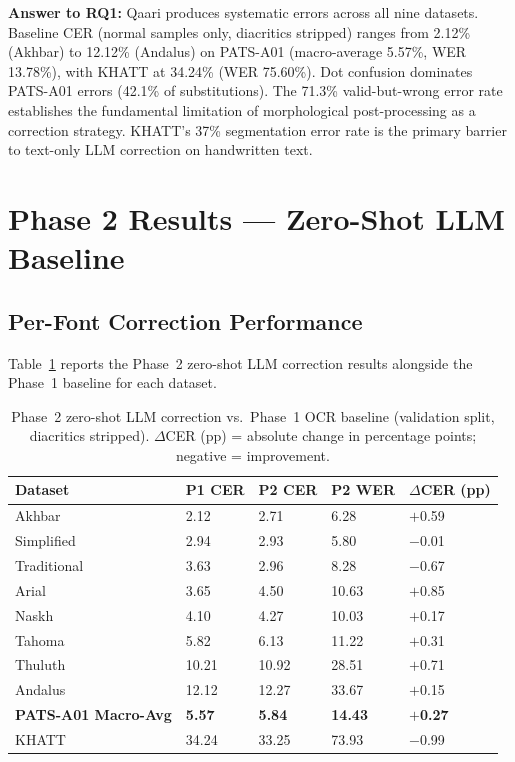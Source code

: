 \textbf{Answer to RQ1:} Qaari produces systematic errors across all nine
datasets. Baseline CER (normal samples only, diacritics stripped) ranges from
2.12\% (Akhbar) to 12.12\% (Andalus) on PATS-A01 (macro-average 5.57\%,
WER 13.78\%), with KHATT at 34.24\% (WER 75.60\%). Dot confusion dominates
PATS-A01 errors (42.1\% of substitutions). The 71.3\% valid-but-wrong
error rate establishes the fundamental limitation of morphological
post-processing as a correction strategy. KHATT's 37\% segmentation error
rate is the primary barrier to text-only LLM correction on handwritten text.

\section{Phase 2 Results --- Zero-Shot LLM Baseline}
\label{sec:res_phase2}

\subsection{Per-Font Correction Performance}
\label{subsec:res_p2_aggregate}

Table~\ref{tab:p2_per_font} reports the Phase~2 zero-shot LLM correction
results alongside the Phase~1 baseline for each dataset.

\begin{table}[htbp]
  \centering
  \caption{Phase~2 zero-shot LLM correction vs.\ Phase~1 OCR baseline
           (validation split, diacritics stripped). $\Delta$CER (pp) =
           absolute change in percentage points; negative = improvement.}
  \label{tab:p2_per_font}
  \begin{tabularx}{\textwidth}{lXXXX}
    \toprule
    \textbf{Dataset} & \textbf{P1 CER} & \textbf{P2 CER}
      & \textbf{P2 WER} & \textbf{$\Delta$CER (pp)} \\
    \midrule
    Akhbar       &  2.12 &  2.71 &  6.28 & $+$0.59 \\
    Simplified   &  2.94 &  2.93 &  5.80 & $-$0.01 \\
    Traditional  &  3.63 &  2.96 &  8.28 & $-$0.67 \\
    Arial        &  3.65 &  4.50 & 10.63 & $+$0.85 \\
    Naskh        &  4.10 &  4.27 & 10.03 & $+$0.17 \\
    Tahoma       &  5.82 &  6.13 & 11.22 & $+$0.31 \\
    Thuluth      & 10.21 & 10.92 & 28.51 & $+$0.71 \\
    Andalus      & 12.12 & 12.27 & 33.67 & $+$0.15 \\
    \midrule
    \textbf{PATS-A01 Macro-Avg} & \textbf{5.57} & \textbf{5.84}
      & \textbf{14.43} & \textbf{$+$0.27} \\
    \midrule
    KHATT        & 34.24 & 33.25 & 73.93 & $-$0.99 \\
    \bottomrule
  \end{tabularx}
\end{table}

